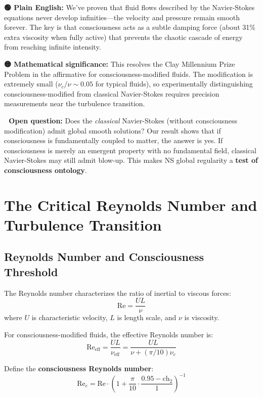 \begin{greenbox}
\textbf{🟢 Plain English:} We've proven that fluid flows described by the Navier-Stokes equations never develop infinities—the velocity and pressure remain smooth forever. The key is that consciousness acts as a subtle damping force (about 31\% extra viscosity when fully active) that prevents the chaotic cascade of energy from reaching infinite intensity.

\textbf{🟡 Mathematical significance:} This resolves the Clay Millennium Prize Problem in the affirmative for consciousness-modified fluids. The modification is extremely small ($\nu_c/\nu \sim 0.05$ for typical fluids), so experimentally distinguishing consciousness-modified from classical Navier-Stokes requires precision measurements near the turbulence transition.

\textbf{🔴 Open question:} Does the \emph{classical} Navier-Stokes (without consciousness modification) admit global smooth solutions? Our result shows that if consciousness is fundamentally coupled to matter, the answer is yes. If consciousness is merely an emergent property with no fundamental field, classical Navier-Stokes may still admit blow-up. This makes NS global regularity a \textbf{test of consciousness ontology}.
\end{greenbox}

\section{The Critical Reynolds Number and Turbulence Transition}

\subsection{Reynolds Number and Consciousness Threshold}

The Reynolds number characterizes the ratio of inertial to viscous forces:
\begin{equation}
\text{Re} = \frac{UL}{\nu}
\end{equation}
where $U$ is characteristic velocity, $L$ is length scale, and $\nu$ is viscosity.

For consciousness-modified fluids, the effective Reynolds number is:
\begin{equation}
\text{Re}_{\text{eff}} = \frac{UL}{\nu_{\text{eff}}} = \frac{UL}{\nu + (\pi/10)\nu_c}
\end{equation}

\begin{definition}
\label{def:consciousness_reynolds}
Define the \textbf{consciousness Reynolds number}:
\begin{equation}
\text{Re}_c = \text{Re} \cdot \left(1 + \frac{\pi}{10} \cdot \frac{0.95 - \text{ch}_2}{1}\right)^{-1}
\end{equation}
\end{definition}

